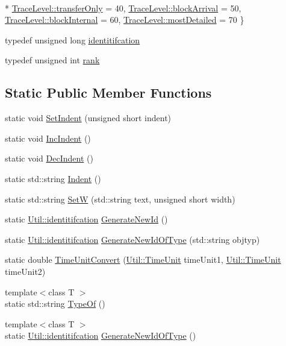 \begin{DoxyCompactItemize}
\\*
\hyperlink{class_util_a0a3482cfa2d915e261c0cf528fdc7afca0a2e7262b7e0ff948fd4a57e7cb178b6}{Trace\+Level\+::transfer\+Only} = 40, 
\hyperlink{class_util_a0a3482cfa2d915e261c0cf528fdc7afcaa784e286f1dae00f9b31823faa5ee90b}{Trace\+Level\+::block\+Arrival} = 50, 
\hyperlink{class_util_a0a3482cfa2d915e261c0cf528fdc7afca08756a99ac8340cce8bab9de954d738e}{Trace\+Level\+::block\+Internal} = 60, 
\hyperlink{class_util_a0a3482cfa2d915e261c0cf528fdc7afcaac18d2ea075dba67f95df9a907eee741}{Trace\+Level\+::most\+Detailed} = 70
 \}
\item 
typedef unsigned long \hyperlink{class_util_ad17d458d9344b10bba64347e514d6d71}{identitifcation}
\item 
typedef unsigned int \hyperlink{class_util_a2a402b3a3a889d699bb3a1a87cbe6d1e}{rank}
\end{DoxyCompactItemize}
\subsection*{Static Public Member Functions}
\begin{DoxyCompactItemize}
\item 
static void \hyperlink{class_util_aa64d3d725f85285a09c980a676ff67aa}{Set\+Indent} (unsigned short indent)
\item 
static void \hyperlink{class_util_a8110241a80979c8fbecca95eef59e9ad}{Inc\+Indent} ()
\item 
static void \hyperlink{class_util_a702d44544c3dd604b81e578ee9ee713f}{Dec\+Indent} ()
\item 
static std\+::string \hyperlink{class_util_a13a4cb5dbc88ef5e2c3a127362b956d6}{Indent} ()
\item 
static std\+::string \hyperlink{class_util_abd6d5e144fa1e2b8327cf5cda68f7b7c}{SetW} (std\+::string text, unsigned short width)
\item 
static \hyperlink{class_util_ad17d458d9344b10bba64347e514d6d71}{Util\+::identitifcation} \hyperlink{class_util_a59ecba8027c38a9d0a3a0e9e9dc94ad7}{Generate\+New\+Id} ()
\item 
static \hyperlink{class_util_ad17d458d9344b10bba64347e514d6d71}{Util\+::identitifcation} \hyperlink{class_util_a96dd76236d7f5888b8dac562e93f9278}{Generate\+New\+Id\+Of\+Type} (std\+::string objtyp)
\item 
static double \hyperlink{class_util_a5f537febaa83db4721745a4730657bab}{Time\+Unit\+Convert} (\hyperlink{class_util_a28504cc2fecc9aa47154cba4e625ec6f}{Util\+::\+Time\+Unit} time\+Unit1, \hyperlink{class_util_a28504cc2fecc9aa47154cba4e625ec6f}{Util\+::\+Time\+Unit} time\+Unit2)
\item 
{\footnotesize template$<$class T $>$ }\\static std\+::string \hyperlink{class_util_a1010d1207367e48e1d417381f32abf1f}{Type\+Of} ()
\item 
{\footnotesize template$<$class T $>$ }\\static \hyperlink{class_util_ad17d458d9344b10bba64347e514d6d71}{Util\+::identitifcation} \hyperlink{class_util_aec5f31f4f467113c25a6aef7bb5f4a40}{Generate\+New\+Id\+Of\+Type} ()
\end{DoxyCompactItemize}


